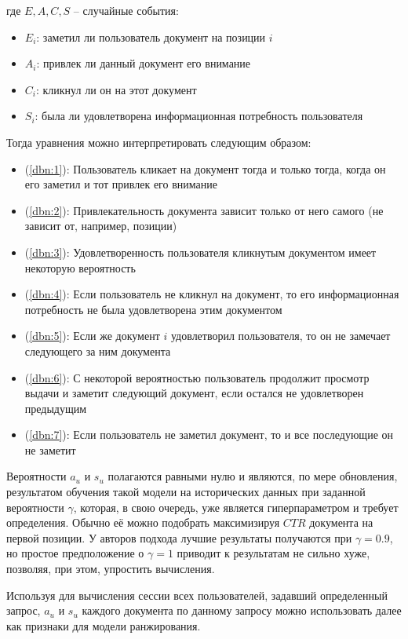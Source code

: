 \documentclass[diploma]{nanolab2015}
\begin{document}
где $E, A, C, S$ -- случайные события:
\begin{itemize}
    \item $E_i$: заметил ли пользователь документ на позиции $i$
    \item $A_i$: привлек ли данный документ его внимание
    \item $C_i$: кликнул ли он на этот документ
    \item $S_i$: была ли удовлетворена информационная потребность пользователя
\end{itemize}
Тогда уравнения можно интерпретировать следующим образом:
\begin{itemize}
    \item (\ref{dbn:1}): Пользователь кликает на документ тогда и только тогда, когда он его заметил и тот привлек его внимание
    \item (\ref{dbn:2}): Привлекательность документа зависит только от него самого (не зависит от, например, позиции)
    \item (\ref{dbn:3}): Удовлетворенность пользователя кликнутым документом имеет некоторую вероятность
    \item (\ref{dbn:4}): Если пользователь не кликнул на документ, то его информационная потребность не была удовлетворена этим документом
    \item (\ref{dbn:5}): Если же документ $i$ удовлетворил пользователя, то он не замечает следующего за ним документа
    \item (\ref{dbn:6}): С некоторой вероятностью пользователь продолжит просмотр выдачи и заметит следующий документ, если остался не удовлетворен предыдущим
    \item (\ref{dbn:7}): Если пользователь не заметил документ, то и все последующие он не заметит
\end{itemize}

Вероятности $a_u$ и $s_u$ полагаются равными нулю и являются, по мере обновления, результатом обучения такой модели на исторических данных при заданной вероятности $\gamma$, которая, в свою очередь, уже является гиперпараметром и требует определения. Обычно её можно подобрать максимизируя $CTR$ документа на первой позиции. У авторов подхода лучшие результаты получаются при $\gamma = 0.9$, но простое предположение о $\gamma = 1$ приводит к результатам не сильно хуже, позволяя, при этом, упростить вычисления.

Используя для вычисления сессии всех пользователей, задавший определенный запрос, $a_u$ и $s_u$ каждого документа по данному запросу можно использовать далее как признаки для модели ранжирования.
\end{document}
